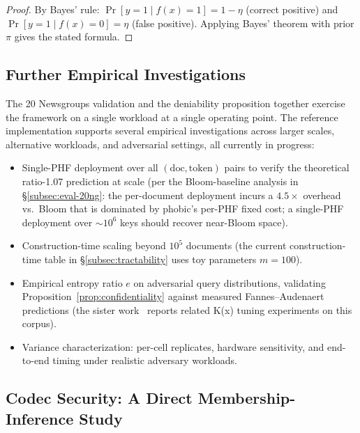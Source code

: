 \documentclass[11pt]{article}
\theoremstyle{definition}
\theoremstyle{plain}
\theoremstyle{remark}
\begin{document}
\begin{proof}
By Bayes' rule: $\Pr[y=1 \mid f(x)=1] = 1-\eta$ (correct positive)
and $\Pr[y=1 \mid f(x)=0] = \eta$ (false positive).  Applying Bayes'
theorem with prior $\pi$ gives the stated formula.
\end{proof}

\subsection{Further Empirical Investigations}
\label{subsec:eval-future}

The 20 Newsgroups validation and the deniability proposition together
exercise the framework on a single workload at a single operating
point.  The reference implementation supports several empirical
investigations across larger scales, alternative workloads, and
adversarial settings, all currently in progress:

\begin{itemize}
\item Single-PHF deployment over all $(\mathrm{doc}, \mathrm{token})$
    pairs to verify the theoretical ratio-1.07 prediction at scale
    (per the Bloom-baseline analysis in
    \S\ref{subsec:eval-20ng}: the per-document deployment incurs a
    $4.5\times$ overhead vs.\ Bloom that is dominated by phobic's
    per-PHF fixed cost; a single-PHF deployment over $\sim 10^6$ keys
    should recover near-Bloom space).
\item Construction-time scaling beyond $10^5$ documents (the current
    construction-time table in \S\ref{subsec:tractability} uses toy
    parameters $m = 100$).
\item Empirical entropy ratio $e$ on adversarial query distributions,
    validating Proposition~\ref{prop:confidentiality} against
    measured Fannes--Audenaert predictions (the sister
    work~\cite{towell2026maxconf} reports related K(x) tuning
    experiments on this corpus).
\item Variance characterization: per-cell replicates, hardware
    sensitivity, and end-to-end timing under realistic adversary
    workloads.
\end{itemize}

\subsection{Codec Security: A Direct Membership-Inference Study}
\label{subsec:eval-codec-security}
\end{document}
